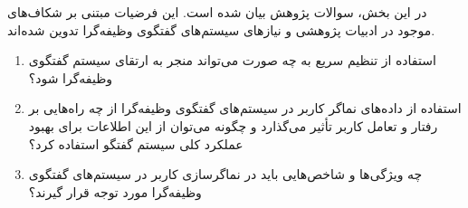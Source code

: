 در این بخش، سوالات پژوهش بیان شده است. این فرضیات مبتنی بر شکاف‌های موجود در ادبیات پژوهشی و نیازهای سیستم‌های گفتگوی وظیفه‌گرا تدوین شده‌اند.

\begin{enumerate}
\item
استفاده از تنظیم سریع به چه صورت می‌تواند منجر به ارتقای سیستم گفتگوی وظیفه‌گرا شود؟

\item
استفاده از داده‌های نماگر کاربر در سیستم‌های گفتگوی وظیفه‌گرا از چه راه‌هایی بر رفتار و تعامل کاربر تأثیر می‌گذارد و چگونه می‌توان از این اطلاعات برای بهبود عملکرد کلی سیستم گفتگو استفاده کرد؟

\item
چه ویژگی‌ها و شاخص‌هایی باید در نماگر‌سازی کاربر در سیستم‌های گفتگوی وظیفه‌گرا مورد توجه قرار گیرند؟
\end{enumerate}

